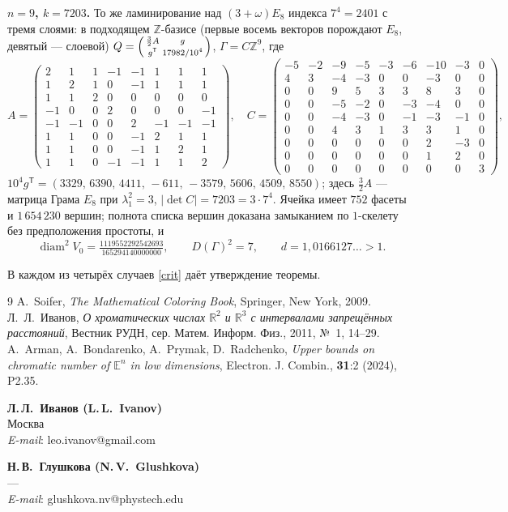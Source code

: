 \documentclass{article}
\newcommand{\R}{\mathbb{R}}
\newcommand{\Z}{\mathbb{Z}}
\newcommand{\diam}{\operatorname{diam}}
\begin{document}
{\bfseries\boldmath $n=9$, $k=7203$.} То же ламинирование над $(3+\omega)E_8$ индекса
$7^4=2401$ с тремя слоями: в подходящем $\Z$-базисе (первые восемь векторов
порождают $E_8$, девятый --- слоевой)
$Q=\Bigl(\begin{smallmatrix}\frac32A&g\\ g^{\mathsf T}&17982/10^4\end{smallmatrix}\Bigr)$,
$\Gamma=C\Z^9$, где
\[
A=\left(\begin{smallmatrix}
2&1&1&-1&-1&1&1&1\\ 1&2&1&0&-1&1&1&1\\ 1&1&2&0&0&0&0&0\\ -1&0&0&2&0&0&0&-1\\
-1&-1&0&0&2&-1&-1&-1\\ 1&1&0&0&-1&2&1&1\\ 1&1&0&0&-1&1&2&1\\ 1&1&0&-1&-1&1&1&2
\end{smallmatrix}\right),\quad
C=\left(\begin{smallmatrix}
-5&-2&-9&-5&-3&-6&-10&-3&0\\ 4&3&-4&-3&0&0&-3&0&0\\ 0&0&9&5&3&3&8&3&0\\
0&0&-5&-2&0&-3&-4&0&0\\ 0&0&-4&-3&0&-1&-3&-1&0\\ 0&0&4&3&1&3&3&1&0\\
0&0&0&0&0&0&2&-3&0\\ 0&0&0&0&0&0&1&2&0\\ 0&0&0&0&0&0&0&0&3
\end{smallmatrix}\right),
\]
$10^4g^{\mathsf T}=(3329,\,6390,\,4411,\,-611,\,-3579,\,5606,\,4509,\,8550)$;
здесь $\tfrac32A$ --- матрица Грама $E_8$ при $\lambda_1^2=3$, $|\det C|=7203=3\cdot7^4$.
Ячейка имеет $752$ фасеты и $1\,654\,230$ вершин; полнота списка вершин
доказана замыканием по $1$-скелету без предположения простоты, и
\[
\diam^2V_0=\tfrac{1119552292542693}{165294140000000},\qquad
D(\Gamma)^2=7,\qquad d=1{,}0166127\ldots>1 .
\]

В каждом из четырёх случаев \eqref{crit} даёт утверждение теоремы.

\begin{thebibliography}{9}
 A.~Soifer, \emph{The Mathematical Coloring Book}, Springer,
New York, 2009.
 Л.~Л.~Иванов, \emph{О хроматических числах $\R^2$ и $\R^3$
с интервалами запрещённых расстояний}, Вестник РУДН, сер. Матем. Информ. Физ.,
2011, №~1, 14--29.
 A.~Arman, A.~Bondarenko, A.~Prymak, D.~Radchenko, \emph{Upper
bounds on chromatic number of $\mathbb E^n$ in low dimensions}, Electron. J.
Combin., \textbf{31}:2 (2024), P2.35.
\end{thebibliography}

\noindent
\parbox[t]{0.5\textwidth}{{\bf Л.\,Л.~Иванов (L.\,L.~Ivanov)}\\
Москва\\
{\it E-mail}: leo.ivanov@gmail.com}%
\parbox[t]{0.5\textwidth}{{\bf Н.\,В.~Глушкова (N.\,V.~Glushkova)}\\
---\\
{\it E-mail}: glushkova.nv@phystech.edu}
\end{document}
